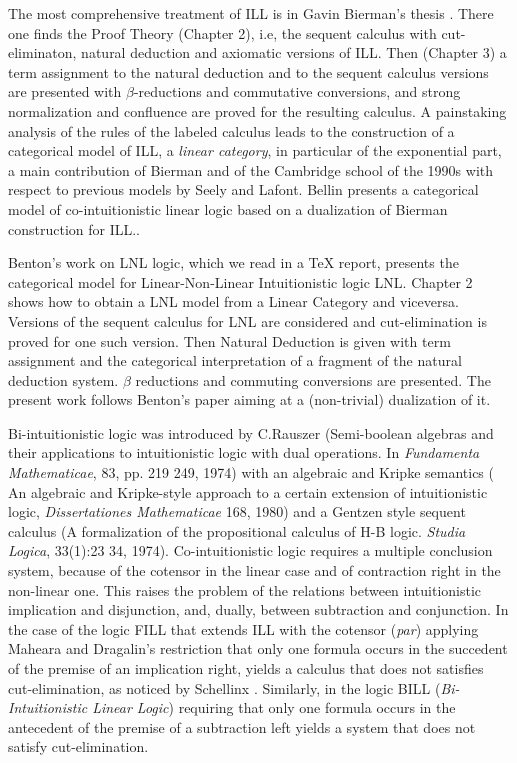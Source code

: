 The most comprehensive treatment of ILL is in Gavin Bierman's thesis  \cite{Bierman:1994}.
There one finds the Proof Theory (Chapter 2), i.e, the sequent calculus with cut-eliminaton, natural deduction and
axiomatic versions of ILL. Then (Chapter 3) a term assignment to the natural deduction and to the sequent calculus
versions are presented with $\beta$-reductions and commutative conversions, and strong normalization and confluence
are proved for the resulting calculus. A painstaking analysis of the rules of the labeled calculus leads to the construction
of a categorical model of ILL, a \emph{linear category}, in particular of the exponential part, a main contribution of Bierman and of the Cambridge school of the 1990s with respect to previous models by Seely and Lafont.
Bellin \cite{Bellin:2012} presents a categorical model of co-intuitionistic linear logic based on a dualization of
Bierman \cite{Bierman:1994} construction for ILL..

Benton's work \cite{Benton:1994} on LNL logic, which we read in a TeX report, 
presents the categorical model for Linear-Non-Linear Intuitionistic logic LNL. 
Chapter 2 shows how to obtain a LNL model from a Linear Category and viceversa. 
Versions of the sequent calculus for LNL are considered  and cut-elimination 
is proved for one such version. Then Natural Deduction is given with term
assignment and the categorical interpretation of a fragment of the natural 
deduction system. $\beta$ reductions and commuting conversions are presented.
The present work follows Benton's paper aiming at a (non-trivial) dualization of it.

Bi-intuitionistic logic was introduced by C.Rauszer \cite{Rauszer:1974} (Semi-boolean algebras and 
their applications to intuitionistic logic with dual operations. In \emph{Fundamenta Mathematicae}, 83, pp. 219 249, 1974)
with an algebraic and Kripke semantics \cite{Rauszer:1980} (  An algebraic and Kripke-style approach to a
certain extension of intuitionistic logic, \emph{Dissertationes Mathematicae} 168, 1980)  and  
a Gentzen style sequent calculus \cite{Rauszer:1974a} (A formalization of the propositional calculus of H-B logic. \emph{Studia Logica}, 33(1):23 34, 1974).
Co-intuitionistic logic requires a multiple conclusion system, because of 
the cotensor in the linear case and of contraction right in the non-linear one. 
This raises the problem of the relations between intuitionistic implication 
and disjunction, and, dually, between subtraction and conjunction. 
In the case of the logic FILL that extends ILL with the cotensor (\emph{par}) 
applying Maheara and Dragalin's restriction that only one formula occurs 
in the succedent of the premise of an implication right, yields a calculus 
that does not satisfies cut-elimination, as noticed by Schellinx 
\cite{Schellinx:1991}. Similarly, in the logic BILL (\emph{Bi-Intuitionistic Linear Logic})
requiring that only one formula occurs in the antecedent of the premise of a 
subtraction left yields a system that does not satisfy cut-elimination. 

